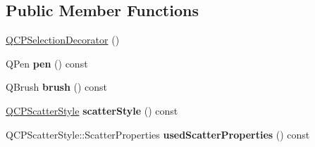 \subsection*{Public Member Functions}
\begin{DoxyCompactItemize}
\item 
\hyperlink{class_q_c_p_selection_decorator_aa145480d9a062cd176fe30900bb7bca8}{Q\+C\+P\+Selection\+Decorator} ()
\item 
Q\+Pen {\bfseries pen} () const \hypertarget{class_q_c_p_selection_decorator_a8365eaa0543756dd6758efa32fbe8041}{}\label{class_q_c_p_selection_decorator_a8365eaa0543756dd6758efa32fbe8041}

\item 
Q\+Brush {\bfseries brush} () const \hypertarget{class_q_c_p_selection_decorator_a661b4703ebd3115dc4b07810dd148b20}{}\label{class_q_c_p_selection_decorator_a661b4703ebd3115dc4b07810dd148b20}

\item 
\hyperlink{class_q_c_p_scatter_style}{Q\+C\+P\+Scatter\+Style} {\bfseries scatter\+Style} () const \hypertarget{class_q_c_p_selection_decorator_a347df79afebbfd5b5a2c9143214ee5b9}{}\label{class_q_c_p_selection_decorator_a347df79afebbfd5b5a2c9143214ee5b9}

\item 
Q\+C\+P\+Scatter\+Style\+::\+Scatter\+Properties {\bfseries used\+Scatter\+Properties} () const \hypertarget{class_q_c_p_selection_decorator_ab82ebdb4915fa7f5c1b253e23e780b13}{}\label{class_q_c_p_selection_decorator_ab82ebdb4915fa7f5c1b253e23e780b13}


\end{DoxyCompactItemize}
